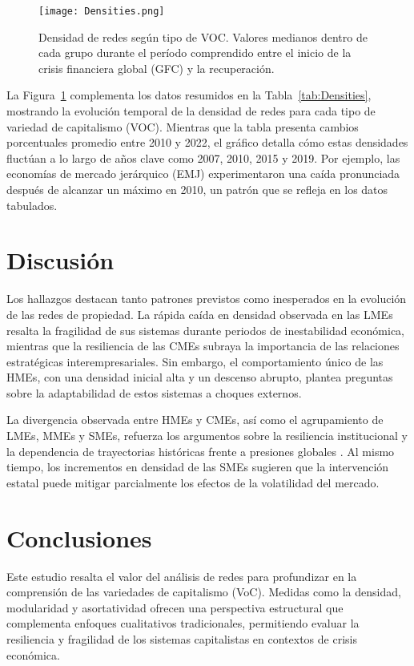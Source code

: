 \documentclass[12pt]{article}
\begin{document}
\begin{figure}[h!]
\centering
\texttt{[image: Densities.png]}
\caption{Densidad de redes según tipo de VOC. Valores medianos dentro de cada grupo durante el período comprendido entre el inicio de la crisis financiera global (GFC) y la recuperación.}
\label{fig:Densities}
\end{figure}

\blindtext

La Figura~\ref{fig:Densities} complementa los datos resumidos en la Tabla~\ref{tab:Densities}, mostrando la evolución temporal de la densidad de redes para cada tipo de variedad de capitalismo (VOC). Mientras que la tabla presenta cambios porcentuales promedio entre 2010 y 2022, el gráfico detalla cómo estas densidades fluctúan a lo largo de años clave como 2007, 2010, 2015 y 2019. Por ejemplo, las economías de mercado jerárquico (EMJ) experimentaron una caída pronunciada después de alcanzar un máximo en 2010, un patrón que se refleja en los datos tabulados.

\section{Discusión}
Los hallazgos destacan tanto patrones previstos como inesperados en la evolución de las redes de propiedad. La rápida caída en densidad observada en las LMEs resalta la fragilidad de sus sistemas durante periodos de inestabilidad económica, mientras que la resiliencia de las CMEs subraya la importancia de las relaciones estratégicas interempresariales. Sin embargo, el comportamiento único de las HMEs, con una densidad inicial alta y un descenso abrupto, plantea preguntas sobre la adaptabilidad de estos sistemas a choques externos.

La divergencia observada entre HMEs y CMEs, así como el agrupamiento de LMEs, MMEs y SMEs, refuerza los argumentos sobre la resiliencia institucional y la dependencia de trayectorias históricas frente a presiones globales \citep{hall2001introduction, hall2009institutional}. Al mismo tiempo, los incrementos en densidad de las SMEs sugieren que la intervención estatal puede mitigar parcialmente los efectos de la volatilidad del mercado.

\blindtext

\section{Conclusiones}
Este estudio resalta el valor del análisis de redes para profundizar en la comprensión de las variedades de capitalismo (VoC). Medidas como la densidad, modularidad y asortatividad ofrecen una perspectiva estructural que complementa enfoques cualitativos tradicionales, permitiendo evaluar la resiliencia y fragilidad de los sistemas capitalistas en contextos de crisis económica.
\end{document}
